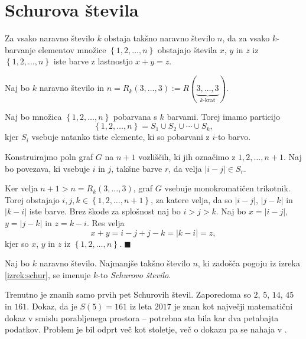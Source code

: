 \documentclass[twoside,11pt]{article}
\providecommand{\set}[1]{\left\{#1\right\}}
\providecommand{\abs}[1]{\left\lvert #1\right\rvert}
\begin{document}
\section{Schurova števila}

\begin{izrek}[Schur] \label{izrek:schur}
    Za vsako naravno število $k$ obstaja takšno naravno število $n$, da za vsako 
    $k$-barvanje elementov množice $\set{1, 2, \dots, n}$ obstajajo števila $x$, $y$ in $z$
    iz $\set{1, 2, \dots, n}$ iste barve z lastnostjo $x + y = z$.
\end{izrek}

\begin{dokaz}
    Naj bo $k$ naravno število in $n = R_k(3, \dots, 3) := R(\underbrace{3, \dots, 3}_{\text{$k$-krat}})$.
    
    Naj bo množica $\set{1, 2, \dots, n}$ pobarvana s $k$ barvami. 
    Torej imamo particijo
    \[
        \set{1, 2, \dots, n} = S_1 \cup S_2 \cup \dotsb \cup S_k,
    \]
    kjer $S_i$ vsebuje natanko tiste elemente, ki so pobarvani z $i$-to barvo.

    Konstruirajmo poln graf $G$ na $n+1$ vozliščih, ki jih označimo z
    $1, 2, \dots, n+1$. Naj bo povezava, ki vsebuje $i$ in $j$, takšne barve $r$,
    da velja $\abs{i-j} \in S_r$. 

    Ker velja $n+1 > n = R_k(3, \dots, 3)$, graf $G$ vsebuje monokromatičen 
    trikotnik. Torej obstajajo $i, j, k \in \set{1,2, \dots, n+1}$, za katere 
    velja, da so $\abs{i-j}$, $\abs{j-k}$ in $\abs{k-i}$ iste barve. Brez škode 
    za splošnost naj bo $i > j > k$. Naj bo $x = \abs{i - j}$, $y = \abs{j - k}$ in 
    $z = {k - i}$. Res velja
    \[
        x + y = i - j + j - k = \abs{k - i} = z,
    \]
    kjer so $x$, $y$ in $z$ iz $\set{1, 2, \dots, n}$. \hfill $\blacksquare$
\end{dokaz}

\begin{definicija}
    Naj bo $k$ naravno število. Najmanjše takšno število $n$, ki zadošča 
    pogoju iz izreka \ref{izrek:schur}, se imenuje 
    $k$-to \emph{Schurovo število}.
\end{definicija}

Trenutno je znanih samo prvih pet Schurovih števil. Zaporedoma so $2$, $5$,
$14$, $45$ in $161$. Dokaz, da je $S(5) = 161$ iz leta $2017$ je znan kot največji 
matematični dokaz v smislu porabljenega prostora -- potrebna sta bila 
kar dva petabajta podatkov. Problem je bil odprt več kot stoletje, več 
o dokazu pa se nahaja v \cite{schur}.
\end{document}
